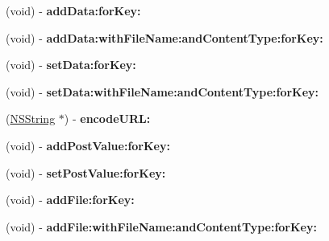 \begin{DoxyCompactItemize}
\item 
\hypertarget{interface_a_s_i_form_data_request_abeb27ef3dc358d5e0a27ba3a077a6653}{
(void) -\/ {\bfseries add\-Data\-:for\-Key\-:}}
\label{interface_a_s_i_form_data_request_abeb27ef3dc358d5e0a27ba3a077a6653}

\item 
\hypertarget{interface_a_s_i_form_data_request_a8ea88f81e036a80e7e7b7f9af04ac421}{
(void) -\/ {\bfseries add\-Data\-:with\-File\-Name\-:and\-Content\-Type\-:for\-Key\-:}}
\label{interface_a_s_i_form_data_request_a8ea88f81e036a80e7e7b7f9af04ac421}

\item 
\hypertarget{interface_a_s_i_form_data_request_a707a5cef615835146cdbed3ceca31016}{
(void) -\/ {\bfseries set\-Data\-:for\-Key\-:}}
\label{interface_a_s_i_form_data_request_a707a5cef615835146cdbed3ceca31016}

\item 
\hypertarget{interface_a_s_i_form_data_request_abbcca0f83bbe93f0132094a99a274098}{
(void) -\/ {\bfseries set\-Data\-:with\-File\-Name\-:and\-Content\-Type\-:for\-Key\-:}}
\label{interface_a_s_i_form_data_request_abbcca0f83bbe93f0132094a99a274098}

\item 
\hypertarget{interface_a_s_i_form_data_request_ab8c6677cbdb0cd4bf7660b79e5afa334}{
(\hyperlink{class_n_s_string}{\-N\-S\-String} $\ast$) -\/ {\bfseries encode\-U\-R\-L\-:}}
\label{interface_a_s_i_form_data_request_ab8c6677cbdb0cd4bf7660b79e5afa334}

\item 
\hypertarget{interface_a_s_i_form_data_request_af9571a143a9feeb009c33c458447aa98}{
(void) -\/ {\bfseries add\-Post\-Value\-:for\-Key\-:}}
\label{interface_a_s_i_form_data_request_af9571a143a9feeb009c33c458447aa98}

\item 
\hypertarget{interface_a_s_i_form_data_request_a90236e7099afbab72bb160029df5a368}{
(void) -\/ {\bfseries set\-Post\-Value\-:for\-Key\-:}}
\label{interface_a_s_i_form_data_request_a90236e7099afbab72bb160029df5a368}

\item 
\hypertarget{interface_a_s_i_form_data_request_afa340cd3b263a621a4f52015cdb8c568}{
(void) -\/ {\bfseries add\-File\-:for\-Key\-:}}
\label{interface_a_s_i_form_data_request_afa340cd3b263a621a4f52015cdb8c568}

\item 
\hypertarget{interface_a_s_i_form_data_request_ae413f676daaf869aa3cac76371466c16}{
(void) -\/ {\bfseries add\-File\-:with\-File\-Name\-:and\-Content\-Type\-:for\-Key\-:}}
\label{interface_a_s_i_form_data_request_ae413f676daaf869aa3cac76371466c16}


\end{DoxyCompactItemize}
